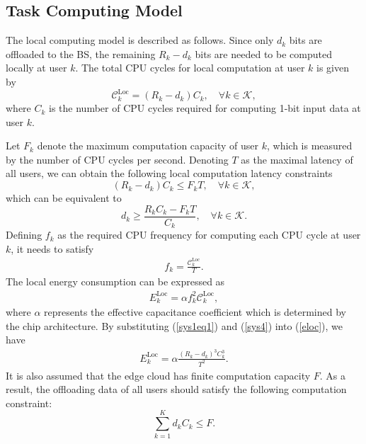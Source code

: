 \documentclass[journal]{IEEEtran}
\begin{document}
\subsection{Task Computing Model}
The local computing model is described as follows.
Since only $d_{k}$ bits are offloaded to the BS, the remaining $R_{k}-d_{k}$ bits are needed to be computed locally at user $k$.
The total CPU cycles for local computation at user $k$ is given by
\begin{equation}\label{sys1eq1}
\mathcal C_{k}^{\text{Loc}} = (R_{k}-d_{k}) C_{k}, \quad \forall k\in\mathcal K,
\end{equation}
where $C_{k}$ is the number of CPU cycles required for computing 1-bit input data at user $k$.

Let $F_{k}$ denote the maximum computation capacity of user $k$, which is measured by the number of CPU cycles per second.
Denoting $T$ as the maximal latency of all users, we can obtain the following local computation latency constraints
\begin{equation}\label{sys1eq1_2}
(R_{k}-d_{k}) C_{k}\leq F_{k} T, \quad \forall k\in\mathcal K,
\end{equation}
which can be equivalent to
\begin{equation}\label{sys1eq1_22}
d_{k} \geq \frac{R_{k} C_{k}-F_{k} T}
{C_{k}}, \quad \forall k\in\mathcal K.
\end{equation}
Defining $f_{k}$ as the required CPU frequency for computing each CPU cycle at user $k$, it needs to satisfy
\begin{align}\label{sys4}
f_k=\frac{\mathcal C_{k}^{\text{Loc}}}{T}.
\end{align}
The local energy consumption can be expressed as \cite{NOMAmecWang}
\begin{align}\label{eloc}
E_{k}^{\text{Loc}}=\alpha f^2_k\mathcal C_{k}^{\text{Loc}},
\end{align}
where $\alpha$ represents the effective capacitance coefficient which is determined by the chip architecture.
By substituting (\ref{sys1eq1}) and (\ref{sys4}) into (\ref{eloc}), we have
\begin{align}
E_{k}^{\text{Loc}}=\alpha\frac{(R_{k}-d_{k})^3 C^3_{k}}{T^2}.
\end{align}
It is also assumed that the edge cloud has finite computation capacity $F$.
As a result, the offloading data of all users should satisfy the following computation constraint:
\begin{equation}\label{sys1eq1_3}
\sum_{k=1}^K d_{k} C_{k}\leq F.
\end{equation}
\end{document}
